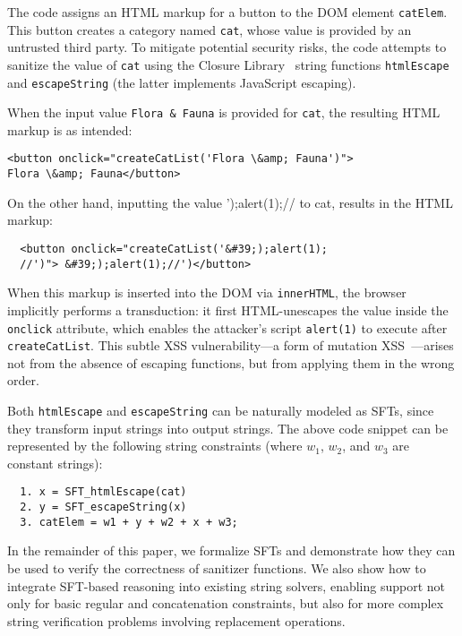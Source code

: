 The code assigns an HTML markup for a button to the DOM element \texttt{catElem}. This button creates a category named \texttt{cat}, whose value is provided by an untrusted third party. To mitigate potential security risks, the code attempts to sanitize the value of \texttt{cat} using the Closure Library~\cite{closure-library} string functions \texttt{htmlEscape} and \texttt{escapeString} (the latter implements JavaScript escaping). 

When the input value \texttt{Flora \& Fauna} is provided for \texttt{cat}, the resulting HTML markup is as intended:
\begin{verbatim}
<button onclick="createCatList('Flora \&amp; Fauna')">
Flora \&amp; Fauna</button>
\end{verbatim}
On the other hand, inputting the value ');alert(1);// to cat,
results in the HTML markup:
\begin{verbatim}
  <button onclick="createCatList('&#39;);alert(1);
  //')"> &#39;);alert(1);//')</button>
\end{verbatim}

When this markup is inserted into the DOM via \texttt{innerHTML}, the browser implicitly performs a transduction: it first HTML-unescapes the value inside the \texttt{onclick} attribute, which enables the attacker’s script \texttt{alert(1)} to execute after \texttt{createCatList}. This subtle XSS vulnerability—a form of mutation XSS~\cite{mutation-xss}—arises not from the absence of escaping functions, but from applying them in the wrong order.

Both \texttt{htmlEscape} and \texttt{escapeString} can be naturally modeled as SFTs, since they transform input strings into output strings. The above code snippet can be represented by the following string constraints (where $w_1$, $w_2$, and $w_3$ are constant strings):

\begin{verbatim}
  1. x = SFT_htmlEscape(cat)
  2. y = SFT_escapeString(x)
  3. catElem = w1 + y + w2 + x + w3;
\end{verbatim}

In the remainder of this paper, we formalize SFTs and demonstrate how they can be used to verify the correctness of sanitizer functions. We also show how to integrate SFT-based reasoning into existing string solvers, enabling support not only for basic regular and concatenation constraints, but also for more complex string verification problems involving replacement operations.





